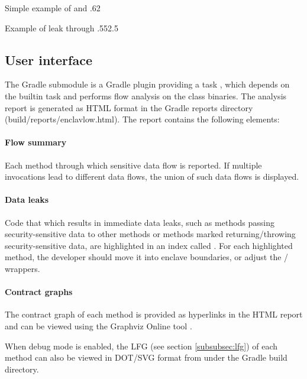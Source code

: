 {Simple example of  and }{.6}{2}

{Example of leak through }{.55}{2.5}

\subsection{User interface}\label{subsec:user-interface}
The  Gradle submodule
is a Gradle plugin providing a task ,
which depends on the  builtin task
and performs flow analysis on the class binaries.
The analysis report is generated as HTML format in the Gradle reports directory
(build/reports/enclavlow.html).
The report contains the following elements:

\paragraph{Flow summary}
Each method through which sensitive data flow is reported.
If multiple invocations lead to different data flows,
the union of such data flows is displayed.

\paragraph{Data leaks}
Code that which results in immediate data leaks,
such as methods passing security-sensitive data to other  methods
or methods marked  returning/throwing security-sensitive data,
are highlighted in an index called .
For each highlighted method, the developer
should move it into enclave boundaries,
or adjust the / wrappers.

\paragraph{Contract graphs}
The contract graph of each method is provided as hyperlinks in the HTML report
and can be viewed using the Graphviz Online tool \cite{dreampuf}.

When debug mode is enabled, the \ac{LFG} (see section \ref{subsubsec:lfg})
of each method can also be viewed in DOT/SVG format from 
under the Gradle build directory.

